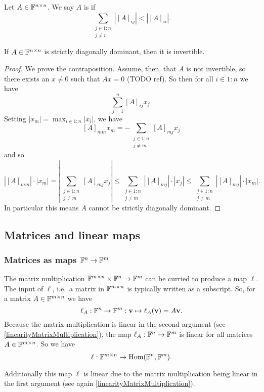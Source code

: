 \begin{definition}
Let $A\in\mathbb{F}^{n\times n}$. We say $A$ is  if
\[ \sum_{\substack{j \in 1:n \\ j\neq i}}|[A]_{ij}| < |[A]_{ii}|. \]
\end{definition}
\begin{proposition} \label{invertibleDiagonallyDominant}
If $A\in\mathbb{F}^{n\times n}$ is strictly diagonally dominant, then it is invertible.
\end{proposition}
\begin{proof}
We prove the contraposition. Assume, then, that $A$ is not invertible, so there exists an $x\neq 0$ such that $Ax = 0$ (TODO ref). So then for all $i\in 1:n$ we have
\[ \sum_{j = 1}^n [A]_{ij}x_j. \]
Setting $|x_m| = \max_{i\in 1:n}|x_i|$, we have
\[ [A]_{mm}x_m = -\sum_{\substack{j\in 1:n \\ j\neq m}}[A]_{mj}x_j \]
and so
\[ |[A]_{mm}|\cdot |x_m| = |\sum_{\substack{j\in 1:n \\ j\neq m}}[A]_{mj}x_j| \leq \sum_{\substack{j\in 1:n \\ j\neq m}}|[A]_{mj}|\cdot |x_j| \leq \sum_{\substack{j\in 1:n \\ j\neq m}}|[A]_{mj}|\cdot |x_m|.\]
In particular this means $A$ cannot be strictly diagonally dominant.
\end{proof}

\subsection{Matrices and linear maps}
\subsubsection{Matrices as maps $\mathbb{F}^n\to \mathbb{F}^m$}
The matrix multiplication $\mathbb{F}^{m\times n}\times \mathbb{F}^n \to \mathbb{F}^m$ can be curried to produce a map $\ell$. The input of $\ell$, i.e.\ a matrix in $\mathbb{F}^{m\times n}$ is typically written as a subscript. So, for a matrix $A\in\mathbb{F}^{m\times n}$ we have
\[ \ell_A: \mathbb{F}^n \to \mathbb{F}^m: \boldsymbol{\mathrm{v}}\mapsto \ell_A(\boldsymbol{\mathrm{v}}) = A\boldsymbol{\mathrm{v}}. \]
Because the matrix multiplication is linear in the second argument (see \ref{linearityMatrixMultiplication}), the map $\ell_A: \mathbb{F}^n \to \mathbb{F}^m$ is linear for all matrices $A\in \mathbb{F}^{m\times n}$. So we have
\[ \ell: \mathbb{F}^{m\times n}\to \operatorname{Hom}(\mathbb{F}^n, \mathbb{F}^m). \]

Additionally this map $\ell$ is linear due to the matrix multiplication being linear in the first argument (see again \ref{linearityMatrixMultiplication}).

